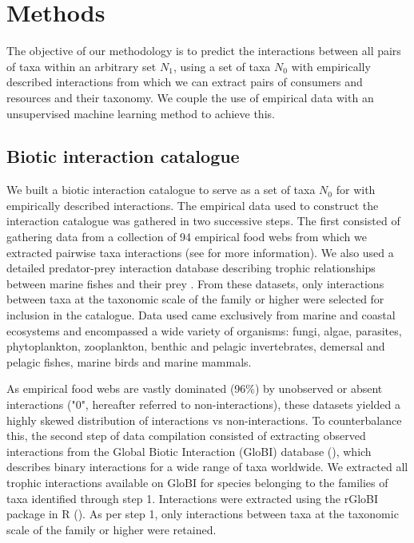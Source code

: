 \section{Methods}
The objective of our methodology is to predict the interactions between all pairs of taxa within an arbitrary set $N_1$, using a set of taxa $N_0$ with empirically described interactions from which we can extract pairs of consumers and resources and their taxonomy. We couple the use of empirical data with an unsupervised machine learning method to achieve this.

 \subsection{Biotic interaction catalogue}
We built a biotic interaction catalogue to serve as a set of taxa $N_0$ for with empirically described interactions. The empirical data used to construct the interaction catalogue was gathered in two successive steps. The first consisted of gathering data from a collection of 94 empirical food webs from which we extracted pairwise taxa interactions (see \cite{brose2005, kortsch2015, universityofcanberra2016} for more information). We also used a detailed predator-prey interaction database describing trophic relationships between marine fishes and their prey \citep{barnes2008}. From these datasets, only interactions between taxa at the taxonomic scale of the family or higher were selected for inclusion in the catalogue. Data used came exclusively from marine and coastal ecosystems and encompassed a wide variety of organisms: fungi, algae, parasites, phytoplankton, zooplankton, benthic and pelagic invertebrates, demersal and pelagic fishes, marine birds and marine mammals.

As empirical food webs are vastly dominated (96\%) by unobserved or absent interactions ("0", hereafter referred to non-interactions), these datasets yielded a highly skewed distribution of interactions vs non-interactions. To counterbalance this, the second step of data compilation consisted of extracting observed interactions from the Global Biotic Interaction (GloBI) database (\cite{poelen2014}), which describes binary interactions for a wide range of taxa worldwide. We extracted all trophic interactions available on GloBI for species belonging to the families of taxa identified through step 1. Interactions were extracted using the rGloBI package in R (\cite{poelen2015}). As per step 1, only interactions between taxa at the taxonomic scale of the family or higher were retained.

